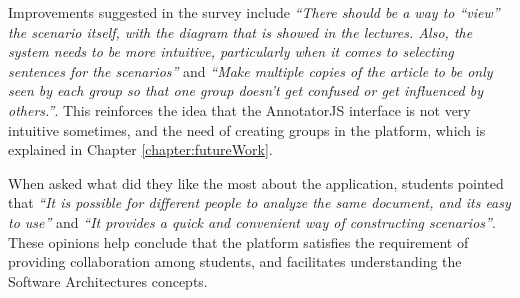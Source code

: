 Improvements suggested in the survey include \textit{``There should be a way to ``view'' the scenario itself, with the diagram that is showed in the lectures. Also, the system needs to be more intuitive, particularly when it comes to selecting sentences for the scenarios''} and \textit{``Make multiple copies of the article to be only seen by each group so that one group doesn't get confused or get influenced by others.''}. This reinforces the idea that the AnnotatorJS interface is not very intuitive sometimes, and the need of creating groups in the platform, which is explained in Chapter \ref{chapter:futureWork}.

When asked what did they like the most about the application, students pointed that \textit{``It is possible for different people to analyze the same document, and its easy to use''} and \textit{``It provides a quick and convenient way of constructing scenarios''}. These opinions help conclude that the platform satisfies the requirement of providing collaboration among students, and facilitates understanding the Software Architectures concepts.

